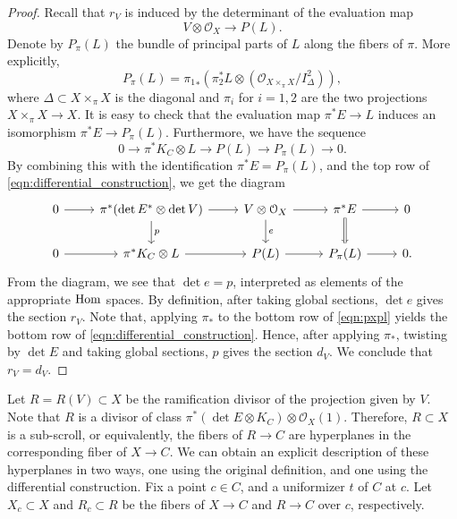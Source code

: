 \documentclass[11pt,reqno]{amsart}
\theoremstyle{plain}
\theoremstyle{definition}
\theoremstyle{remark}
\numberwithin{equation}{section}
\renewcommand{\to}{{\longrightarrow}}
\numberwithin{equation}{section}
\renewcommand{\O}{\mathcal O}
\begin{document}
\begin{proof}
  Recall that $r_V$ is induced by the determinant of the evaluation map
  \[ V \otimes \O_X \to P(L).\]
  Denote by $P_\pi(L)$ the bundle of principal parts of $L$ along the fibers of $\pi$.
  More explicitly,
  \[ P_\pi(L) = {\pi_1}_* \left(\pi_2^* L \otimes \left(\O_{X \times_\pi X} / I_{\Delta}^2\right)\right),\]
  where $\Delta \subset X \times_\pi X$ is the diagonal and $\pi_i$ for $i = 1,2$ are the two projections $X \times_\pi X \to X$.
  It is easy to check that the evaluation map $\pi^* E \to L$ induces an isomorphism $\pi^* E \to P_\pi(L)$.
  Furthermore, we have the sequence
  \[ 0 \to \pi^* K_C \otimes L \to P(L) \to P_\pi(L) \to 0.\]
  By combining this with the identification $\pi^* E = P_\pi(L)$, and the top row of \eqref{eqn:differential_construction}, we get the diagram
  \begin{equation}\label{eqn:pxpl}
    \begin{tikzcd}
      0 \arrow{r}& \pi^*(\det E^* \otimes \det V) \arrow{r}\arrow{d}{p}& V \otimes \O_X \arrow{r}\arrow{d}{e}& \pi^* E \arrow{r}\arrow{d}\arrow[equal]{d}& 0\\
      0 \arrow{r}& \pi^* K_C \otimes L \arrow{r}& P(L) \arrow{r}& P_\pi(L) \arrow{r}& 0.
    \end{tikzcd}
  \end{equation}
  From the diagram, we see that $\det e = p$, interpreted as elements of the appropriate $\operatorname{Hom}$ spaces.
  By definition, after taking global sections, $\det e$ gives the section $r_V$.
  Note that, applying $\pi_*$ to the bottom row of \eqref{eqn:pxpl} yields the bottom row of \eqref{eqn:differential_construction}.
  Hence, after applying $\pi_*$, twisting by $\det E$ and taking global sections, $p$ gives the section $d_V$.
  We conclude that $r_V = d_V$.
\end{proof}

Let $R = R(V) \subset X$ be the ramification divisor of the projection given by $V$.
Note that $R$ is a divisor of class $\pi^*(\det E \otimes K_C) \otimes \O_X(1)$.
Therefore, $R \subset X$ is a sub-scroll, or equivalently, the fibers of $R \to C$ are hyperplanes in the corresponding fiber of $X \to C$.
We can obtain an explicit description of these hyperplanes in two ways, one using the original definition, and one using the differential construction.
Fix a point $c \in C$, and a uniformizer $t$ of $C$ at $c$.
Let $X_c \subset X$ and $R_c \subset R$ be the fibers of $X \to C$ and $R \to C$ over $c$, respectively.
\end{document}
